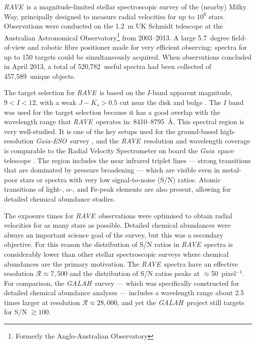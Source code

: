 \documentclass[preprint,trackchanges]{aastex}
\newcommand{\acronym}[1]{{\small{#1}}}
\newcommand{\project}[1]{\textsl{#1}}
\newcommand{\gaia}{\project{Gaia}}
\newcommand{\rave}{\project{\acronym{RAVE}}}
\newcommand{\galah}{\project{\acronym{GALAH}}}
\newcommand{\ges}{\project{Gaia-ESO}}
\newcommand{\Nspectra}{520,782}
\newcommand{\Nstars}{457,589}
\begin{document}
\rave\ is a magnitude-limited stellar spectroscopic survey of the (nearby) Milky Way,
principally designed to measure radial velocities for up to $10^6$ stars.
Observations were conducted on the 1.2~m UK Schmidt telescope at the Australian 
Astronomical Observatory\footnote{Formerly the Anglo-Australian Observatory} from 
2003--2013.  A large 5.7~degree field-of-view and robotic fibre positioner made for 
very efficient observing:  spectra for up to 150 targets could be simultaneously
acquired.  When observations concluded in April 2013, a total of \Nspectra\ useful 
spectra had been collected of \Nstars\ unique objects. 


The target selection for \rave\ is based on the $I$-band apparent magnitude,
$9 < I < 12$, with a weak $J - K_s > 0.5$ cut near the disk and bulge \citep{Wonjo_2016}.  
The $I$ band was used for the target selection because it has a good overlap with the
wavelength range that \rave\ operates in:  8410--8795~\AA.  This spectral region 
is very well-studied.  It is one of the key setups used for the ground-based 
high-resolution \ges\ survey \citep{Gilmore_2012,Randich_2013}, and the 
\rave\ resolution and wavelength coverage is comparable to the Radial Velocity 
Spectrometer on board the \gaia\ space telescope \citep{Kordopatis_2011,Recio-Blanco_2016}.  
The region includes the  near infrared triplet lines --- strong 
transitions that are dominated by pressure broadening --- which are visible even 
in metal-poor stars or spectra with very low signal-to-noise (S/N) ratios.
Atomic transitions of 
light-, $\alpha$-, and Fe-peak elements are also present, allowing for detailed 
chemical abundance studies.


The exposure times for \rave\ observations were optimised to obtain radial 
velocities for as many stars as possible.  Detailed chemical abundances were
always an important science goal of the survey, but this was a secondary objective.  
For this reason the distribution of S/N ratios in \rave\ spectra is considerably 
lower than other stellar spectroscopic surveys where chemical abundances are the 
primary motivation.  The \rave\ spectra have an effective resolution 
$\mathcal{R} \approx 7{,}500$ and the distribution of S/N ratios peaks at 
$\approx$50~pixel$^{-1}$.  For comparison, the \galah\ survey 
\citep{DeSilva_2015} --- which was specifically constructed for detailed chemical 
abundance analyses --- includes a wavelength range about 2.5 times larger at 
resolution $\mathcal{R} \approx 28{,}000$, and yet the \galah\ project still 
targets for S/N $\gtrsim100$.
\end{document}
